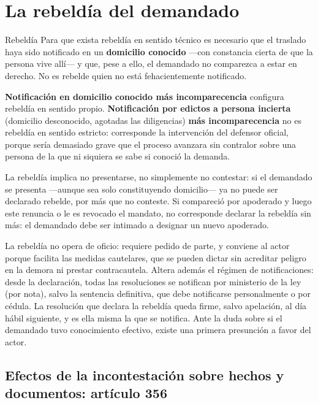 \documentclass[12pt,oneside]{book}
\begin{document}
\section{La rebeldía del demandado}

\begin{definition}{Rebeldía}
Para que exista rebeldía en sentido técnico es necesario que el traslado haya sido notificado en un \textbf{domicilio conocido} ---con constancia cierta de que la persona vive allí--- y que, pese a ello, el demandado no comparezca a estar en derecho. No es rebelde quien no está fehacientemente notificado.
\end{definition}

\begin{important}
\textbf{Notificación en domicilio conocido más incomparecencia} configura rebeldía en sentido propio. \textbf{Notificación por edictos a persona incierta} (domicilio desconocido, agotadas las diligencias) \textbf{más incomparecencia} no es rebeldía en sentido estricto: corresponde la intervención del defensor oficial, porque sería demasiado grave que el proceso avanzara sin contralor sobre una persona de la que ni siquiera se sabe si conoció la demanda.
\end{important}

La rebeldía implica no presentarse, no simplemente no contestar: si el demandado se presenta ---aunque sea solo constituyendo domicilio--- ya no puede ser declarado rebelde, por más que no conteste. Si compareció por apoderado y luego este renuncia o le es revocado el mandato, no corresponde declarar la rebeldía sin más: el demandado debe ser intimado a designar un nuevo apoderado.

La rebeldía no opera de oficio: requiere pedido de parte, y conviene al actor porque facilita las medidas cautelares, que se pueden dictar sin acreditar peligro en la demora ni prestar contracautela. Altera además el régimen de notificaciones: desde la declaración, todas las resoluciones se notifican por ministerio de la ley (por nota), salvo la sentencia definitiva, que debe notificarse personalmente o por cédula. La resolución que declara la rebeldía queda firme, salvo apelación, al día hábil siguiente, y es ella misma la que se notifica. Ante la duda sobre si el demandado tuvo conocimiento efectivo, existe una primera presunción a favor del actor.

\subsection{Efectos de la incontestación sobre hechos y documentos: artículo 356}
\end{document}
